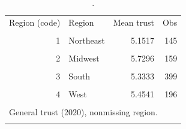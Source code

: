 \begin{table}[htbp]\centering
\caption{.}
\label{tab:trust_mean_by_censreg_2020}
\begin{tabular}{rlrr}\toprule
Region (code) & Region & Mean trust & Obs \\\\ \midrule
1 & Northeast & 5.1517 & 145 \\\\
2 & Midwest & 5.7296 & 159 \\\\
3 & South & 5.3333 & 399 \\\\
4 & West & 5.4541 & 196 \\\\
\bottomrule
\multicolumn{4}{l}{\footnotesize General trust (2020), nonmissing region.} \\\\
\end{tabular}\end{table}
